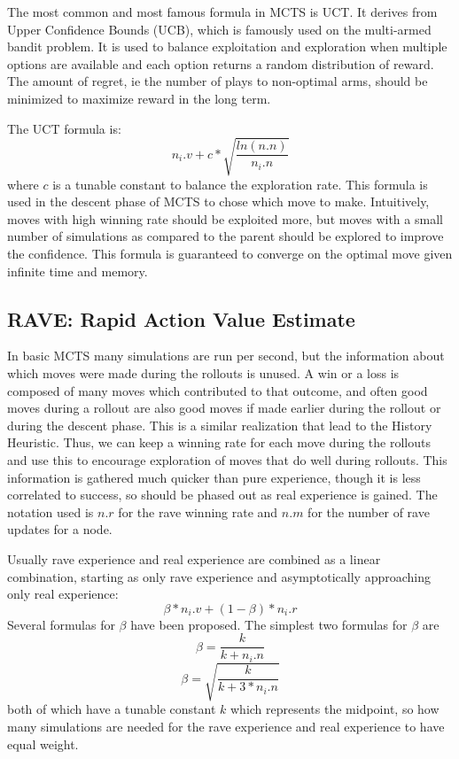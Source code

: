 The most common and most famous formula in MCTS is UCT. It derives from Upper Confidence Bounds (UCB), which is famously used on the multi-armed bandit problem. It is used to balance exploitation and exploration when multiple options are available and each option returns a random distribution of reward. The amount of regret, ie the number of plays to non-optimal arms, should be minimized to maximize reward in the long term.

The UCT formula is: $$n_i.v + c*\sqrt{\frac{ln(n.n)}{n_i.n}}$$ where $c$ is a tunable constant to balance the exploration rate. This formula is used in the descent phase of MCTS to chose which move to make. Intuitively, moves with high winning rate should be exploited more, but moves with a small number of simulations as compared to the parent should be explored to improve the confidence. This formula is guaranteed to converge on the optimal move given infinite time and memory.




\subsection{RAVE: Rapid Action Value Estimate}

In basic MCTS many simulations are run per second, but the information about which moves were made during the rollouts is unused. A win or a loss is composed of many moves which contributed to that outcome, and often good moves during a rollout are also good moves if made earlier during the rollout or during the descent phase. This is a similar realization that lead to the History Heuristic. Thus, we can keep a winning rate for each move during the rollouts and use this to encourage exploration of moves that do well during rollouts. This information is gathered much quicker than pure experience, though it is less correlated to success, so should be phased out as real experience is gained. The notation used is $n.r$ for the rave winning rate and $n.m$ for the number of rave updates for a node.

Usually rave experience and real experience are combined as a linear combination, starting as only rave experience and asymptotically approaching only real experience:
$$ \beta*n_i.v + (1-\beta)*n_i.r $$
Several formulas for $\beta$ have been proposed. The simplest two formulas for $\beta$ are $$\beta = \frac{k}{k+n_i.n}$$ $$\beta = \sqrt{\frac{k}{k+3*n_i.n}}$$ both of which have a tunable constant $k$ which represents the midpoint, so how many simulations are needed for the rave experience and real experience to have equal weight.

